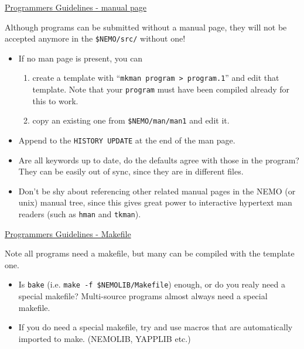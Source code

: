 \centerline{\underline{Programmers Guidelines - manual page}}

Although programs can be submitted without a manual page, they will
not be accepted anymore in the {\tt \$NEMO/src/} without one!

\begin{itemize}
\item

If no man page is present, you can 
\begin{enumerate}

\item
create a template with ``{\tt mkman program > program.1}'' and edit
that template. Note that your {\tt program} must have been compiled
already for this to work.

\item
copy an existing one from {\tt \$NEMO/man/man1}
and edit it.

\end{enumerate}


\item
Append to the {\tt HISTORY UPDATE} at the end of the man page.

\item
Are all keywords up to date, do the defaults agree with those
in the program? They can be easily out of sync, since they
are in different files.

\item
Don't be shy about referencing other related manual pages in the
NEMO (or unix) manual tree, since this gives great power
to interactive hypertext man readers (such as {\tt hman} and
{\tt tkman}).

\end{itemize}

\centerline{\underline{Programmers Guidelines - Makefile}}

Note all programs need a makefile, but many can be compiled with
the template one.

\begin{itemize}
\item
Is {\tt bake} (i.e. {\tt make -f \$NEMOLIB/Makefile})  enough, or
do you realy need a special makefile? Multi-source programs
almost always need a special makefile.

\item
If you do need a special makefile, try and use macros that
are automatically imported to make. (NEMOLIB, YAPPLIB etc.)

\end{itemize}

